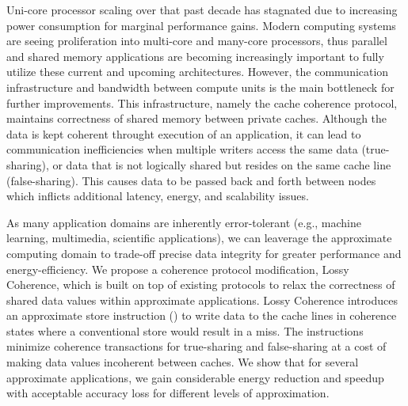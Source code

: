 Uni-core processor scaling over that past decade has stagnated due to increasing power consumption for marginal performance gains. Modern computing systems are seeing proliferation into multi-core and many-core processors, thus parallel and shared memory applications are becoming increasingly important to fully utilize these current and upcoming architectures. However, the communication infrastructure and bandwidth between compute units is the main bottleneck for further improvements. This infrastructure, namely the cache coherence protocol, maintains correctness of shared memory between private caches. Although the data is kept coherent throught execution of an application, it can lead to communication inefficiencies when multiple writers access the same data (true-sharing), or data that is not logically shared but resides on the same cache line (false-sharing). This causes data to be passed back and forth between nodes which inflicts additional latency, energy, and scalability issues.

As many application domains are inherently error-tolerant (e.g., machine learning, multimedia, scientific applications), we can leaverage the approximate computing domain to trade-off precise data integrity for greater performance and energy-efficiency. We propose a coherence protocol modification, Lossy Coherence, which is built on top of existing protocols to relax the correctness of shared data values within approximate applications. Lossy Coherence  introduces an approximate store instruction (\storea) to write data to the cache lines in coherence states where a conventional store would result in a miss. The \storea instructions minimize coherence transactions for true-sharing and false-sharing at a cost of making data values incoherent between caches. We show that for several approximate applications, we gain considerable energy reduction and speedup with acceptable accuracy loss for different levels of approximation.